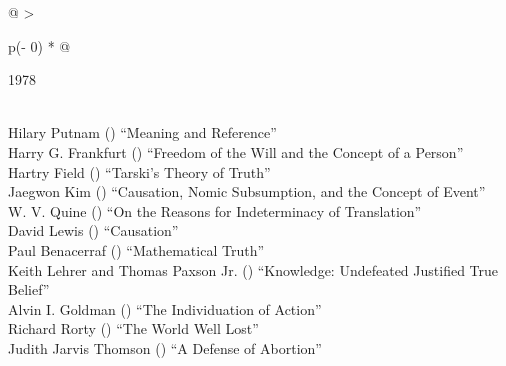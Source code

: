 \documentclass[
  10pt,
  letterpaper,
  DIV=11,
  numbers=noendperiod,
  twoside]{scrartcl}
\begin{document}
\begin{longtable}[]{@{}
  >{\raggedright\arraybackslash}p{(\columnwidth - 0\tabcolsep) * }@{}}

\caption{\label{tbl-top-ten-1969}Most cited articles published less than
ten years ago as of 1978.}

\tabularnewline

\toprule\noalign{}
\begin{minipage}[b]{\linewidth}\raggedright
1978
\end{minipage} \\
\midrule\noalign{}
\endhead
\bottomrule\noalign{}
\endlastfoot
Hilary Putnam
()
``Meaning and Reference'' \\
Harry G. Frankfurt
()
``Freedom of the Will and the Concept of a Person'' \\
Hartry Field
()
``Tarski's Theory of Truth'' \\
Jaegwon Kim
()
``Causation, Nomic Subsumption, and the Concept of Event'' \\
W. V. Quine
()
``On the Reasons for Indeterminacy of Translation'' \\
David Lewis
()
``Causation'' \\
Paul Benacerraf
()
``Mathematical Truth'' \\
Keith Lehrer and Thomas Paxson Jr.
()
``Knowledge: Undefeated Justified True Belief'' \\
Alvin I. Goldman
()
``The Individuation of Action'' \\
Richard Rorty
()
``The World Well Lost'' \\
Judith Jarvis Thomson
()
``A Defense of Abortion'' \\

\end{longtable}
\end{document}

